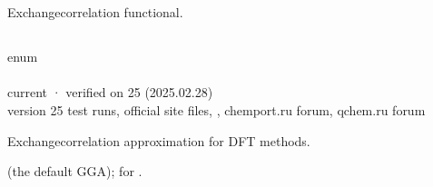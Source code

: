 \documentclass[letterpaper,10pt,english,openany,oneside]{sphinxmanual}
\begin{document}
\sphinxAtStartPar
{} {\hyperref[\detokenize{reference/atoms:atoms-core}]{}}

\sphinxstepscope




\section{}
\label{\detokenize{reference/dft:dft}}\label{\detokenize{reference/dft:group-dft}}\label{\detokenize{reference/dft::doc}}
\ignorespaces 
\sphinxAtStartPar
Exchange\textendash{}correlation functional.


\subsection{}
\label{\detokenize{reference/dft:functional}}\label{\detokenize{reference/dft:dft-functional}}
\ignorespaces 
\sphinxAtStartPar
{} enum\\
 \\
 current · verified on 25 (2025.02.28)\\
 version 25 test runs, official site files, , chemport.ru forum, qchem.ru forum

\sphinxAtStartPar
Exchange\textendash{}correlation approximation for DFT methods.

\sphinxAtStartPar
{}  (the default GGA);  for .
\end{document}
